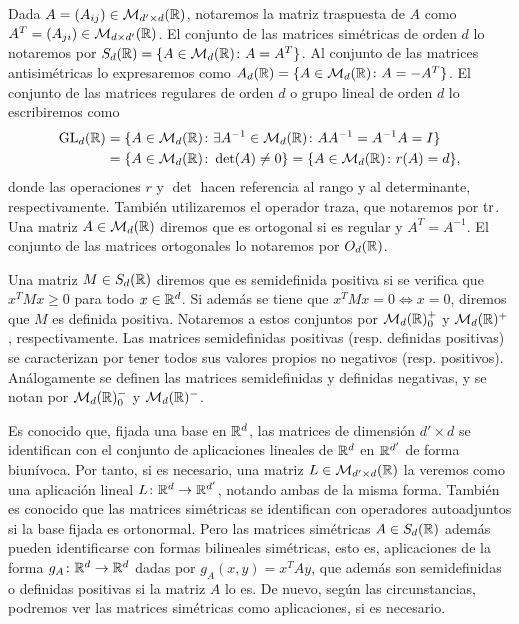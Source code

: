Dada $A = (A_{ij}) \in \mathcal{M}_{d'\times d}(\mathbb{R})$, notaremos la matriz traspuesta de $A$ como $A^T = (A_{ji}) \in \mathcal{M}_{d\times d'}(\mathbb{R})$. El conjunto de las matrices simétricas de orden $d$ lo notaremos por $S_d(\mathbb{R}) = \{ A \in \mathcal{M}_d(\mathbb{R}) \colon A = A^T\}$. Al conjunto de las matrices antisimétricas lo expresaremos como $A_d(\mathbb{R}) = \{A \in \mathcal{M}_d(\mathbb{R}) \colon A = -A^T\}$. El conjunto de las matrices regulares de orden $d$ o grupo lineal de orden $d$ lo escribiremos como
\begin{align*}
\operatorname{GL}_d(\mathbb{R}) &= \{A \in \mathcal{M}_d(\mathbb{R}) \colon \exists A^{-1} \in \mathcal{M}_d(\mathbb{R}) \colon AA^{-1} = A^{-1}A = I \}\\
          &= \{A \in \mathcal{M}_d(\mathbb{R}) \colon \det(A) \ne 0\} = \{A \in \mathcal{M}_d(\mathbb{R}) \colon r(A) = d\},
\end{align*}
donde las operaciones $r$ y $\det$ hacen referencia al rango y al determinante, respectivamente. También utilizaremos el operador traza, que notaremos por $\operatorname{tr}$. Una matriz $A \in \mathcal{M}_{d}(\mathbb{R})$ diremos que es ortogonal si es regular y $A^T = A^{-1}$. El conjunto de las matrices ortogonales lo notaremos por $O_d(\mathbb{R})$.

Una matriz $M \in S_d(\mathbb{R})$ diremos que es semidefinida positiva si se verifica que $x^T M x \ge 0$ para todo $x \in \mathbb{R}^d$. Si además se tiene que $x^TMx = 0 \iff x = 0$, diremos que $M$ es definida positiva. Notaremos a estos conjuntos por $\mathcal{M}_d(\mathbb{R})^+_0$ y $\mathcal{M}_d(\mathbb{R})^+$, respectivamente. Las matrices semidefinidas positivas (resp. definidas positivas) se caracterizan por tener todos sus valores propios no negativos (resp. positivos). Análogamente se definen las matrices semidefinidas y definidas negativas, y se notan por $\mathcal{M}_d(\mathbb{R})^-_0$ y $\mathcal{M}_d(\mathbb{R})^-$.

Es conocido que, fijada una base en $\mathbb{R}^d$, las matrices de dimensión $d' \times d$ se identifican con el conjunto de aplicaciones lineales de $\mathbb{R}^d$ en $\mathbb{R}^{d'}$ de forma biunívoca. Por tanto, si es necesario, una matriz $L \in \mathcal{M}_{d'\times d}(\mathbb{R})$ la veremos como una aplicación lineal $L \colon \mathbb{R}^d \to \mathbb{R}^{d'}$, notando ambas de la misma forma. También es conocido que las matrices simétricas se identifican con operadores autoadjuntos si la base fijada es ortonormal. Pero las matrices simétricas $A \in S_d(\mathbb{R})$ además pueden identificarse con formas bilineales simétricas, esto es, aplicaciones de la forma $g_A \colon \mathbb{R}^d \to \mathbb{R}^d$ dadas por $g_A(x,y) = x^TAy$, que además son semidefinidas o definidas positivas si la matriz $A$ lo es. De nuevo, según las circunstancias, podremos ver las matrices simétricas como aplicaciones, si es necesario.

